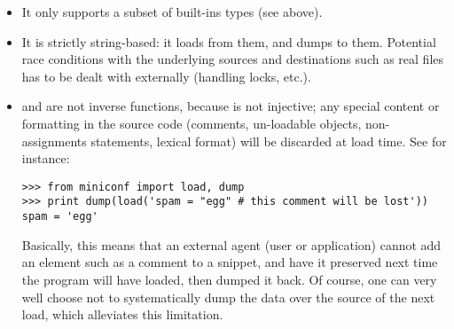 \documentclass{howto}
\begin{document}
\begin{itemize}
\item
It only supports a subset of built-ins types (see above).

\item
It is strictly string-based: it loads from them, and dumps to them. Potential
race conditions with the underlying sources and destinations such as real files
has to be dealt with externally (handling locks, etc.).

\item
{} and  are not inverse functions, because
 is not injective; any special content or formatting in the
source code (comments, un-loadable objects, non-assignments statements, lexical
format) will be discarded at load time. See for instance:

\begin{verbatim}
>>> from miniconf import load, dump
>>> print dump(load('spam = "egg" # this comment will be lost'))
spam = 'egg'
\end{verbatim}

Basically, this means that an external agent (user or application)
cannot add an element such as a comment to a snippet, and have it
preserved next time the program will have loaded, then dumped it
back. Of course, one can very well choose not to systematically dump
the data over the source of the next load, which alleviates this
limitation.
\end{itemize}
\end{document}
